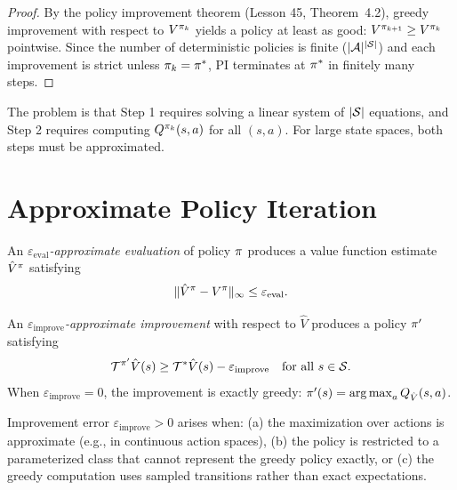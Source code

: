 \documentclass[11pt,a4paper]{article}
\begin{document}
\begin{proof}
By the policy improvement theorem (Lesson 45, Theorem~4.2), greedy
improvement with respect to $V^{\pi_k}$ yields a policy at least
as good: $V^{\pi_{k+1}} \geq V^{\pi_k}$ pointwise. Since
the number of deterministic policies is finite ($|\mathcal{A}|^{|\mathcal{S}|}$)
and each improvement is strict unless $\pi_k = \pi^*$, PI
terminates at $\pi^*$ in finitely many steps.
\end{proof}

The problem is that Step 1 requires solving a linear system of
$|\mathcal{S}|$ equations, and Step 2 requires computing
$Q^{\pi_k}(s,a)$ for all $(s,a)$. For large state spaces, both
steps must be approximated.

\section{Approximate Policy Iteration}
\label{sec:approx_pi}

\begin{definition}
\label{def:approx_eval}
An \emph{$\varepsilon_{\mathrm{eval}}$-approximate evaluation} of
policy $\pi$ produces a value function estimate
$\hat{V}^\pi$ satisfying
\begin{equation}
  \|\hat{V}^\pi - V^\pi\|_\infty
  \leq \varepsilon_{\mathrm{eval}}.
  \label{eq:eval_error}
\end{equation}
\end{definition}

\begin{definition}
\label{def:approx_improve}
An \emph{$\varepsilon_{\mathrm{improve}}$-approximate improvement}
with respect to $\hat{V}$ produces a policy $\pi'$ satisfying
\begin{equation}
  \mathcal{T}^{\pi'} \hat{V}(s)
  \geq \mathcal{T}^* \hat{V}(s) - \varepsilon_{\mathrm{improve}}
  \quad \text{for all } s \in \mathcal{S}.
  \label{eq:improve_error}
\end{equation}
When $\varepsilon_{\mathrm{improve}} = 0$, the improvement is
exactly greedy: $\pi'(s) = \operatorname{arg\,max}_a Q_{\hat{V}}(s,a)$.
\end{definition}

\begin{remark}
\label{rem:improve_error}
Improvement error $\varepsilon_{\mathrm{improve}} > 0$ arises when:
(a) the maximization over actions is approximate (e.g., in continuous
action spaces), (b) the policy is restricted to a parameterized class
that cannot represent the greedy policy exactly, or (c) the greedy
computation uses sampled transitions rather than exact expectations.
\end{remark}
\end{document}
